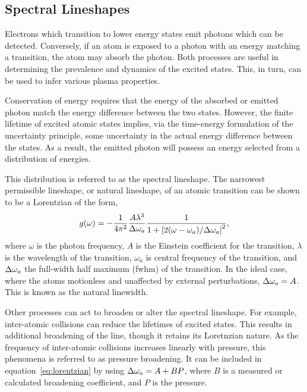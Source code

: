 \subsection{Spectral Lineshapes}

Electrons which transition to lower energy states emit photons which can be
detected. Conversely, if an atom is exposed to a photon with an energy matching
a transition, the atom may absorb the photon. Both processes are useful in
determining the prevalence and dynamics of the excited states. This, in turn,
can be used to infer various plasma properties.

Conservation of energy requires that the energy of the absorbed or emitted
photon match the energy difference between the two states. However, the finite
lifetime of excited atomic states implies, via the time-energy formulation of
the uncertainty principle, some uncertainty in the actual energy difference
between the states. As a result, the emitted photon will possess an energy
selected from a distribution of energies.

This distribution is referred to as the spectral lineshape. The narrowest
permissible lineshape, or natural lineshape, of an atomic transition can be shown
\cite{Siegman1986} to be a Lorentzian of the form,
\begin{equation}
  g(\omega) = -\frac{1}{4\pi^2}\frac{A\lambda^3}{\Delta \omega_a}
  \frac{1}{1 + \left[2(\omega-\omega_a)/\Delta \omega_a\right]^2},
  \label{eq:lorentzian}
\end{equation}
where $\omega$ is the photon frequency, $A$ is the Einstein coefficient for the
transition, $\lambda$ is the wavelength of the transition, $\omega_a$ is central
frequency of the transition, and $\Delta \omega_a$ the full-width half maximum (\acs{fwhm})
of the transition. In the ideal case, where the atoms motionless and unaffected
by external perturbations, $\Delta \omega_a = A$. This is known as the natural linewidth.

Other processes can act to broaden or alter the spectral lineshape. For example,
inter-atomic collisions can reduce the lifetimes of excited states. This results
in additional broadening of the line, though it retains its Loretnzian nature.
As the frequency of inter-atomic collisions increases linearly with pressure,
this phenomena is referred to as pressure broadening. It can be included in
equation~\ref{eq:lorentzian} by using $\Delta \omega_a = A + BP$, where $B$ is a measured
or calculated broadening coefficient, and $P$ is the pressure.

